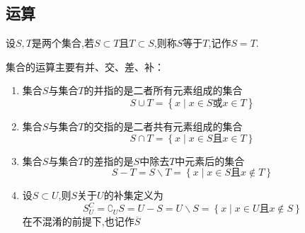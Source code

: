 \subsection{运算}
\begin{formal}
    \begin{definition}[集合的相等]\label{def:集合的相等}
        设$S,T$是两个集合,若$S\subset T$且$T\subset S$,则称$S$等于$T$,记作$S=T$.
    \end{definition}
\end{formal}
\begin{formal}
    \begin{definition}[集合的并、交、差、补]\label{def:集合的并、交、差、补}
        集合的运算主要有并、交、差、补：
        \begin{enumerate}[label={\textup{(\arabic*)}}]
            \item 集合$S$与集合$T$的并指的是二者所有元素组成的集合\[
            S\cup T=\left\{
                x\mid x\in S\text{或}x\in T
            \right\}
            \]
            \item 集合$S$与集合$T$的交指的是二者共有元素组成的集合\[
            S\cap T=\left\{
                x\mid x\in S\text{且}x\in T
            \right\}
            \]
            \item 集合$S$与集合$T$的差指的是$S$中除去$T$中元素后的集合\[
             S-T=S\backslash T=\left\{
                x\mid x\in S\text{且}x\notin T
            \right\}
            \]
            \item 设$S\subset U$,则$S$关于$U$的补集定义为\[
            S^C_U=\complement_US=U-S=U\backslash S=\left\{
                x\mid x\in U\text{且}x\notin S
            \right\}
            \]在不混淆的前提下,也记作$\overline{S}$
        \end{enumerate}
    \end{definition}
\end{formal}
